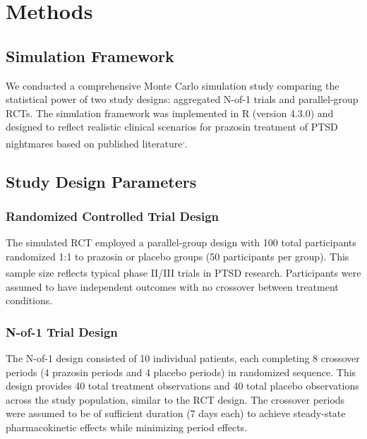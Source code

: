 \documentclass[
  11pt,
]{article}
\begin{document}
\section{Methods}\label{methods}

\subsection{Simulation Framework}\label{simulation-framework}

We conducted a comprehensive Monte Carlo simulation study comparing the
statistical power of two study designs: aggregated N-of-1 trials and
parallel-group RCTs. The simulation framework was implemented in R
(version 4.3.0) and designed to reflect realistic clinical scenarios for
prazosin treatment of PTSD nightmares based on published
literature\textsuperscript{,}.

\subsection{Study Design Parameters}\label{study-design-parameters}

\subsubsection{Randomized Controlled Trial
Design}\label{randomized-controlled-trial-design}

The simulated RCT employed a parallel-group design with 100 total
participants randomized 1:1 to prazosin or placebo groups (50
participants per group). This sample size reflects typical phase II/III
trials in PTSD
research\textsuperscript{}.
Participants were assumed to have independent outcomes with no crossover
between treatment conditions.

\subsubsection{N-of-1 Trial Design}\label{n-of-1-trial-design}

The N-of-1 design consisted of 10 individual patients, each completing 8
crossover periods (4 prazosin periods and 4 placebo periods) in
randomized sequence. This design provides 40 total treatment
observations and 40 total placebo observations across the study
population, similar to the RCT design. The crossover periods were
assumed to be of sufficient duration (7 days each) to achieve
steady-state pharmacokinetic effects while minimizing period effects.
\end{document}

